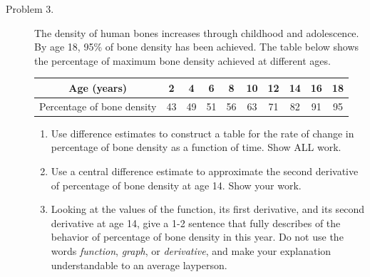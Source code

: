 \documentclass[addpoints]{exam}
\begin{document}
\begin{description}
	\item[Problem 3.] The density of human bones increases through childhood and adolescence. By age 18, 95\% of bone density has been achieved. The table below shows the percentage of maximum bone density achieved at different ages. 
	\begin{center}
		\begin{tabular}{c||c|c|c|c|c|c|c|c|c} 
		Age (years) & 2 & 4 & 6 & 8 & 10 & 12 & 14 & 16 & 18 \\ \hline
		Percentage of bone density & 43 & 49 & 51 & 56 & 63 & 71 & 82 & 91 & 95 
		\end{tabular}
	\end{center}
	\begin{enumerate}
		\item Use difference estimates to construct a table for the rate of change in percentage of bone density as a function of time. Show ALL work. 
		\item Use a central difference estimate to approximate the second derivative of percentage of bone density at age 14. Show your work. 
		\item Looking at the values of the function, its first derivative, and its second derivative at age 14, give a 1-2 sentence that fully describes of the behavior of percentage of bone density in this year. Do not use the words \emph{function}, \emph{graph}, or \emph{derivative}, and make your explanation understandable to an average layperson. 
	\end{enumerate}

\end{description}
\end{document}
